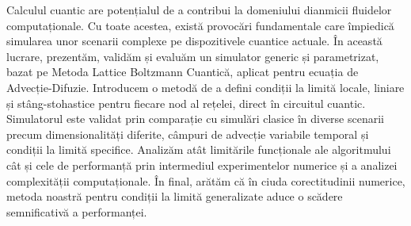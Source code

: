 
Calculul cuantic are potențialul de a contribui la domeniului dianmicii fluidelor computaționale. Cu toate acestea, există provocări fundamentale care împiedică simularea unor scenarii complexe pe dispozitivele cuantice actuale.
În această lucrare, prezentăm, validăm și evaluăm un simulator generic și parametrizat, bazat pe Metoda Lattice Boltzmann Cuantică, aplicat pentru ecuația de Advecție-Difuzie.
Introducem o metodă de a defini condiții la limită locale, liniare și stâng-stohastice pentru fiecare nod al rețelei, direct în circuitul cuantic.
Simulatorul este validat prin comparație cu simulări clasice în diverse scenarii precum dimensionalități diferite, câmpuri de advecție variabile temporal și condiții la limită specifice.
Analizăm atât limitările funcționale ale algoritmului cât și cele de performanță prin intermediul experimentelor numerice și a analizei complexității computaționale.
În final, arătăm că în ciuda corectitudinii numerice, metoda noastră pentru condiții la limită generalizate aduce o scădere semnificativă a performanței. 